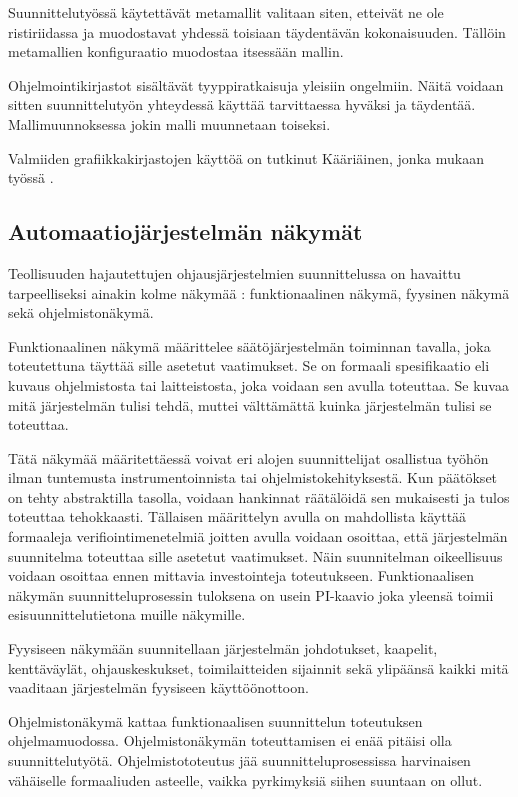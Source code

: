 \documentclass[finnish,12pt]{article}
\begin{document}
Suunnittelutyössä käytettävät metamallit valitaan siten, etteivät ne ole
ristiriidassa ja muodostavat yhdessä toisiaan täydentävän kokonaisuuden.
Tällöin metamallien konfiguraatio muodostaa itsessään mallin.

Ohjelmointikirjastot sisältävät tyyppiratkaisuja yleisiin ongelmiin.
Näitä voidaan sitten suunnittelutyön yhteydessä käyttää tarvittaessa hyväksi ja täydentää.
Mallimuunnoksessa jokin malli muunnetaan toiseksi.

Valmiiden grafiikkakirjastojen käyttöä on tutkinut Kääriäinen, jonka mukaan
työssä .

	\subsection{Automaatiojärjestelmän näkymät}

Teollisuuden hajautettujen ohjausjärjestelmien suunnittelussa on havaittu
tarpeelliseksi ainakin kolme näkymää \cite{RefWorks:38}: funktionaalinen näkymä, fyysinen näkymä sekä ohjelmistonäkymä.

Funktionaalinen näkymä määrittelee säätöjärjestelmän toiminnan tavalla, joka toteutettuna täyttää sille asetetut vaatimukset. Se on formaali spesifikaatio eli kuvaus ohjelmistosta tai laitteistosta, joka voidaan sen avulla toteuttaa. Se kuvaa mitä järjestelmän tulisi tehdä, muttei välttämättä kuinka järjestelmän tulisi se toteuttaa.

Tätä näkymää määritettäessä voivat eri alojen suunnittelijat osallistua työhön ilman
tuntemusta instrumentoinnista tai ohjelmistokehityksestä. Kun päätökset on tehty
abstraktilla tasolla, voidaan hankinnat räätälöidä sen mukaisesti ja tulos
toteuttaa tehokkaasti.
Tällaisen määrittelyn avulla on mahdollista käyttää formaaleja verifiointimenetelmiä joitten avulla
voidaan osoittaa, että järjestelmän suunnitelma toteuttaa sille asetetut vaatimukset.
Näin suunnitelman oikeellisuus voidaan osoittaa ennen mittavia investointeja toteutukseen.
Funktionaalisen näkymän suunnitteluprosessin tuloksena on usein
PI-kaavio joka yleensä toimii esisuunnittelutietona muille näkymille.

Fyysiseen näkymään suunnitellaan järjestelmän johdotukset, kaapelit, kenttäväylät,
ohjauskeskukset, toimilaitteiden sijainnit sekä ylipäänsä kaikki mitä vaaditaan 
järjestelmän fyysiseen käyttöönottoon.

Ohjelmistonäkymä kattaa funktionaalisen suunnittelun toteutuksen ohjelmamuodossa.
Ohjelmistonäkymän toteuttamisen ei enää pitäisi olla suunnittelutyötä.
Ohjelmistototeutus jää suunnitteluprosessissa harvinaisen vähäiselle formaaliuden asteelle, vaikka pyrkimyksiä siihen suuntaan on ollut.
\end{document}
